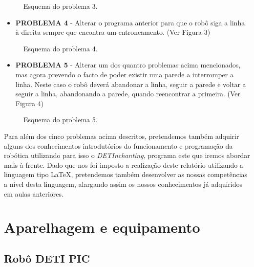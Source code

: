 \documentclass[a4paper, 12pt, onecolumn, oneside]{report}
\begin{document}
  \begin{figure}[H] 
\center{\texttt{[image: f2]}}
\caption{Esquema do problema 3.}
\label{fig:speciation}
\end{figure}



\begin{itemize}
  \item \textbf{PROBLEMA 4} - Alterar o programa anterior para que o robô siga a linha à direita sempre que encontra um entroncamento. (Ver Figura 3)
\end{itemize}


\begin{figure}[H] 
\center{\texttt{[image: f3]}}
\caption{Esquema do problema 4.}
\label{fig:speciation}
\end{figure}

\newpage

\begin{itemize}
  \item \textbf{PROBLEMA 5} - Alterar um dos quantro problemas acima mencionados, mas agora prevendo o facto de poder existir uma parede a interromper a linha. Neste caso o robô deverá abandonar a linha, seguir a parede e voltar a seguir a linha, abandonando a parede, quando reencontrar a primeira. (Ver Figura 4)
\end{itemize}


\begin{figure}[H] 
\center{\texttt{[image: f4]}}
\caption{Esquema do problema 5.}
\label{fig:speciation}
\end{figure}



Para além dos cinco problemas acima descritos, pretendemos também adquirir alguns dos conhecimentos introdutórios do funcionamento e programação da robótica utilizando para isso o \emph{DETInchanting}, programa este que iremos abordar mais à frente. Dado que nos foi imposto a realização deste relatório utilizando a linguagem tipo \LaTeX, pretendemos também desenvolver as nossas competências a nível desta linguagem, alargando assim os nossos conhecimentos já adquiridos em aulas anteriores.


\newpage
\section{Aparelhagem e equipamento}



\subsection{Robô DETI PIC}
\end{document}
